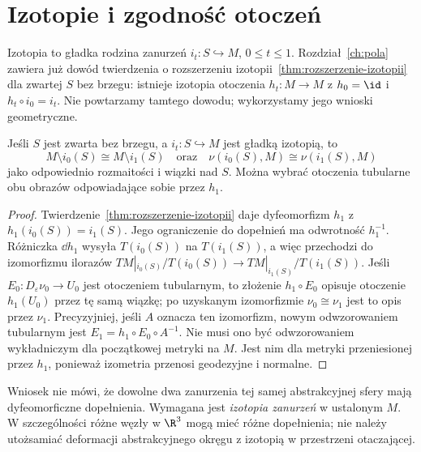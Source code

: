 \section{Izotopie i zgodność otoczeń}
\label{sec:izotopie-otoczen-15}

Izotopia to gładka rodzina zanurzeń
$i_t:S\hookrightarrow M$, $0\leq t\leq1$.
Rozdział~\ref{ch:pola} zawiera
już dowód twierdzenia o rozszerzeniu
izotopii~\ref{thm:rozszerzenie-izotopii}
dla zwartej $S$ bez brzegu:
istnieje izotopia otoczenia
$h_t:M\to M$ z $h_0=\id$
i $h_t\circ i_0=i_t$.
Nie powtarzamy tamtego dowodu;
wykorzystamy jego wnioski geometryczne.

\begin{wniosek}
\label{cor:izotopia-dopelnienia}
Jeśli $S$ jest zwarta bez brzegu,
a $i_t:S\hookrightarrow M$ jest
gładką izotopią, to
\[
 M\setminus i_0(S)\cong M\setminus i_1(S)
 \quad\text{oraz}\quad
 \nu(i_0(S),M)\cong \nu(i_1(S),M)
\]
jako odpowiednio rozmaitości
i wiązki nad $S$. Można wybrać
otoczenia tubularne obu obrazów
odpowiadające sobie przez $h_1$.
\end{wniosek}
\begin{proof}
Twierdzenie~\ref{thm:rozszerzenie-izotopii}
daje dyfeomorfizm $h_1$ z
$h_1(i_0(S))=i_1(S)$.
Jego ograniczenie do dopełnień
ma odwrotność $h_1^{-1}$.
Różniczka $\dd h_1$ wysyła
$T(i_0(S))$ na $T(i_1(S))$,
a więc przechodzi do
izomorfizmu ilorazów
$TM|_{i_0(S)}/T(i_0(S))
\to TM|_{i_1(S)}/T(i_1(S))$.
Jeśli $E_0:D_\varepsilon\nu_0\to U_0$
jest otoczeniem tubularnym,
to złożenie $h_1\circ E_0$
opisuje otoczenie $h_1(U_0)$
przez tę samą wiązkę; po
uzyskanym izomorfizmie $\nu_0\cong\nu_1$
jest to opis przez $\nu_1$. Precyzyjniej, jeśli $A$
oznacza ten izomorfizm, nowym odwzorowaniem tubularnym jest
$E_1=h_1\circ E_0\circ A^{-1}$. Nie musi ono być
odwzorowaniem wykładniczym dla początkowej metryki na $M$.
Jest nim dla metryki przeniesionej przez $h_1$,
ponieważ izometria przenosi geodezyjne i normalne.
\end{proof}

\begin{uwaga}
Wniosek nie mówi, że dowolne dwa
zanurzenia tej samej abstrakcyjnej
sfery mają dyfeomorficzne dopełnienia.
Wymagana jest \emph{izotopia zanurzeń}
w ustalonym $M$. W szczególności
różne węzły w $\R^3$ mogą mieć
różne dopełnienia; nie należy
utożsamiać deformacji abstrakcyjnego
okręgu z izotopią w przestrzeni
otaczającej.
\end{uwaga}

